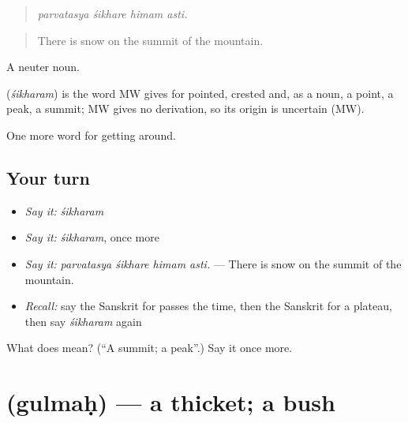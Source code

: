 \begin{quote}
   
\end{quote}

\begin{quote}
\emph{parvatasya śikhare himam asti.}
\end{quote}

\begin{quote}
There is snow on the summit of the mountain.
\end{quote}

A neuter noun.

\begin{cousinweb}
\textbf{} (\emph{śikharam}) is the word MW gives for pointed, crested and, as a noun, a point, a peak, a summit; MW gives no derivation, so its origin is uncertain (MW).
\end{cousinweb}

\begin{grammarlens}[title={What you've built}]
One more word for getting around.
\end{grammarlens}

\subsection*{Your turn}
\begin{itemize}
\raggedright
  \item \emph{Say it:} \emph{śikharam}
  \item \emph{Say it:} \emph{śikharam}, once more
  \item \emph{Say it:} \emph{parvatasya śikhare himam asti.} — There is snow on the summit of the mountain.
  \item \emph{Recall:} say the Sanskrit for passes the time, then the Sanskrit for a plateau, then say \emph{śikharam} again
\end{itemize}

\begin{tcolorbox}[breakable,colback=teal!4,colframe=teal!35!black,title={Before you move on}]
What does  mean? (\textquotedblleft{}A summit; a peak\textquotedblright{}.) Say it once more.
\end{tcolorbox}
\section[\texorpdfstring{\sk{गुल्मः} (gulmaḥ)}{गुल्मः (gulmaḥ)}]{ (gulmaḥ) — a thicket; a bush}

